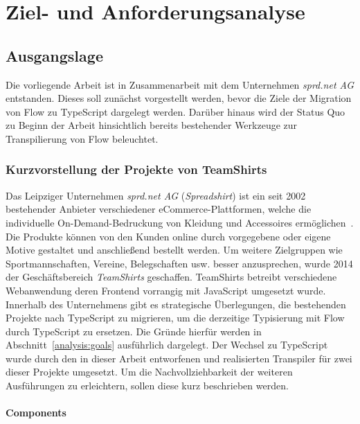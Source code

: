 \chapter{Ziel- und Anforderungsanalyse}
\label{chap:analysis}

\section{Ausgangslage}
\label{sec:status-quo}

Die vorliegende Arbeit ist in Zusammenarbeit mit dem Unternehmen \textit{sprd.net AG} entstanden. Dieses soll zunächst vorgestellt werden, bevor die Ziele der Migration von Flow zu TypeScript  dargelegt werden. Darüber hinaus wird der Status Quo zu Beginn der Arbeit hinsichtlich bereits bestehender Werkzeuge zur Transpilierung von Flow beleuchtet.

\subsection{Kurzvorstellung der Projekte von TeamShirts}

Das Leipziger Unternehmen \textit{sprd.net AG} (\textit{Spreadshirt}) ist ein seit 2002 bestehender Anbieter verschiedener eCommerce-Plattformen, welche die individuelle On-Demand-Bedruckung von Kleidung und Accessoires ermöglichen~\autocite{SPREADSHIRT:ABOUT}. Die Produkte können von den Kunden online durch vorgegebene oder eigene Motive gestaltet und anschließend bestellt werden. Um weitere Zielgruppen wie Sportmannschaften, Vereine, Belegschaften usw. besser anzusprechen, wurde 2014 der Geschäftsbereich \textit{TeamShirts} geschaffen.
TeamShirts betreibt verschiedene Webanwendung deren Frontend vorrangig mit JavaScript umgesetzt wurde. Innerhalb des Unternehmens gibt es strategische Überlegungen, die bestehenden Projekte nach TypeScript zu migrieren, um die derzeitige Typisierung mit Flow durch TypeScript zu ersetzen. Die Gründe hierfür werden in Abschnitt~\ref{analysis:goals} ausführlich dargelegt. Der Wechsel zu TypeScript wurde durch den in dieser Arbeit entworfenen und realisierten Transpiler für zwei dieser Projekte umgesetzt. Um die Nachvollziehbarkeit der weiteren Ausführungen zu erleichtern, sollen diese kurz beschrieben werden.

\subsubsection{Components}

